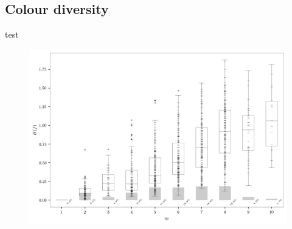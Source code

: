 \documentclass[11pt,a4paper]{article}
\begin{document}



\subsection{Colour diversity}

test 

\begin{figure}[h!]
	\centering
	\includegraphics[width=\linewidth]{figures/colors-boxplot.png}
	\caption{ }
	\label{}
\end{figure}
\end{document}
